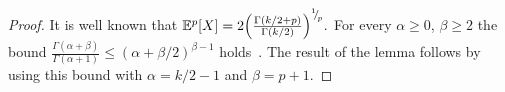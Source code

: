 \begin{proof}
It is well known that
    $
        \mathbb{E}^{p}[X] = 2 \Big( \frac{\Gamma(k/2+p)}{\Gamma(k/2)} \Big)^{{}^{1}{\mskip -5mu/\mskip -3mu}_{p}}.
    $ For every $\alpha \ge 0$, $\beta \ge 2$ the bound $\frac{\Gamma(\alpha+\beta)}{\Gamma(\alpha + 1)} \le (\alpha+\beta/2)^{\beta-1}$ holds~\cite[Equation 2.2]{laforgia-1984-further-inequalities}. The result of the lemma follows by using this bound with $\alpha = k/2-1$ and $\beta = p+1$.
\end{proof}



